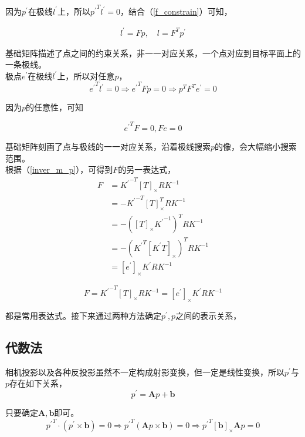 	因为$p^{\prime}$在极线$l^{\prime}$上，所以${{p^{\prime}}^Tl^{\prime} = 0}$，结合（\ref{f_constrain}）可知，

	\begin{align*}
		l^{\prime} = Fp,\quad 
		l = F^Tp^\prime
	\end{align*}

	基础矩阵描述了点之间的约束关系，非一一对应关系，一个点对应到目标平面上的一条极线。\\

	极点$e^\prime$在极线$l^\prime$上，所以对任意$p$，
	$$
		{e^\prime}^T l^\prime = 0 \Rightarrow {e^\prime}^TFp=0 \Rightarrow p^T F^T e^\prime = 0
	$$

	因为$p$的任意性，可知

	$$
		{e^\prime}^T F = 0, Fe = 0
	$$

	基础矩阵刻画了点与极线的一一对应关系，沿着极线搜索$p$的像，会大幅缩小搜索范围。\\

	根据（\ref{inver_m_p}），可得到$F$的另一表达式，
	\begin{align*}
		F &= {K^{\prime}}^{-T}[T]_{\times}RK^{-1} \\
		  &= -{K^{\prime}}^{-T}[T]_{\times}^T RK^{-1}\\
		  &= -\left(
			[T]_{\times} {K^{\prime}}^{-1}
		\right)^T RK^{-1}\\
		  &=-\left(
			{K^{\prime}}^T \left[ K^\prime T\right]_{\times}
		\right)^T RK^{-1}\\
		&= [e^\prime]_{\times}K^{\prime} R K^{-1}
	\end{align*}	

	\begin{equation}
		F =  {K^{\prime}}^{-T} [T{}]_{\times} RK^{-1}  = [e^\prime]_{\times}K^{\prime} R K^{-1}\label{new_F_matrix}
	\end{equation}
	
	都是常用表达式。接下来通过两种方法确定$p^\prime,p$之间的表示关系，

	\subsection*{代数法}

		相机投影以及各种反投影虽然不一定构成射影变换，但一定是线性变换，所以$p^\prime$与$p$存在如下关系，
		$$
			p^\prime = \mathbf{A}p + \mathbf{b}
		$$

		只要确定$\mathbf{A},\mathbf{b}$即可。
		$$
			{p^\prime}^T\cdot\left(p^\prime \times \mathbf{b}\right)  = 0 \Rightarrow {p^\prime}^T\left(\mathbf{A}p\times \mathbf{b}\right) = 0 \Rightarrow {p^\prime}^T[\mathbf{b}]_{\times} \mathbf{A}p = 0
		$$

